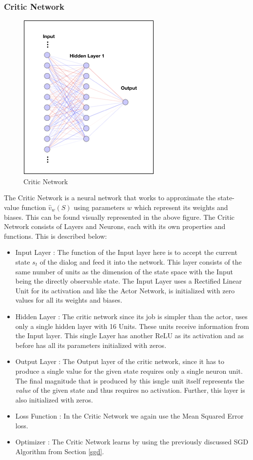 \documentclass[14pt]{extarticle}
\numberwithin{equation}{section}
\begin{document}
	\subsubsection{Critic Network}
	\begin{figure}[h]
		\vspace{0.2cm}
		\centering
		\includegraphics[scale=0.6]{nn-critic}
		\caption{Critic Network
			\label{nn-critic}}
	\end{figure}
	The Critic Network is a neural network that works to approximate the state-value function $\hat{v}_w(S)$ using parameters $w$ which represent its weights and biases. This can be found visually represented in the above figure. The Critic Network consists of Layers and Neurons, each with its own properties and functions. This is described below:
	\begin{itemize}
		\item Input Layer : The function of the Input layer here is to accept the current state $s_t$ of the dialog and feed it into the network. This layer consists of the same number of units as the dimension of the state space with the Input being the directly observable state. The Input Layer uses a Rectified Linear Unit for its activation and like the Actor Network, is initialized with zero values for all its weights and biases.
		\item Hidden Layer : The critic network since its job is simpler than the actor, uses only a single hidden layer with 16 Units. These units receive information from the Input layer. This single Layer has another ReLU as its activation and as before has all its parameters initialized with zeros.
		\item Output Layer : The Output layer of the critic network, since it has to produce a single value for the given state requires only a single neuron unit. The final magnitude that is produced by this isngle unit itself represents the \textit{value} of the given state and thus requires no activation. Further, this layer is also initialized with zeros.
		\item Loss Function : In the Critic Network we again use the Mean Squared Error loss.
		\item Optimizer : The Critic Network learns by using the previously discussed SGD Algorithm from Section \ref{sgd}.
	\end{itemize}
	
\end{document}
